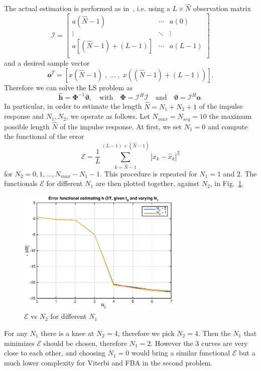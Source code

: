 \documentclass[10pt]{article}
\begin{document}
The actual estimation is performed as in~\cite[p.~246]{bc}, i.e. using a $L \times \hat{N}$ observation matrix
\begin{equation}
	\boldsymbol{\mathcal{I}} =
 \begin{bmatrix}
  a(\hat{N}-1) & \cdots & a(0) \\
  \vdots  & \ddots & \vdots  \\
a[(\hat{N}-1)+(L-1)] & \cdots & a(L-1) \\
 \end{bmatrix}
\end{equation}
and a desired sample vector
\begin{equation}
\mathbf{o}^T = \left[ x(\hat{N}-1)\;,\; \ldots\; , \;x((\hat{N}-1)+(L-1)) \right].
\end{equation}
Therefore we can solve the LS problem as
\begin{equation}
	\hat{\mathbf{h}}= \mathbf{\Phi}^{-1} \boldsymbol{\vartheta}, \quad\mathrm{ with } \quad \mathbf{\Phi}=\boldsymbol{\mathcal{I}}^H \boldsymbol{\mathcal{I}} \quad \mathrm{ and }\quad \boldsymbol{\vartheta} = \boldsymbol{\mathcal{I}}^H \mathbf{o}.
\end{equation}
In particular, in order to estimate the length $\hat{N} = N_1 + N_2 + 1$ of the impulse response and $N_1, N_2$, we operate as follows. Let $N_{max} = N_{seq} = 10$ the maximum possible length $\hat{N}$ of the impulse response. At first, we set $N_1 = 0$ and compute the functional of the error
\begin{equation} 
	\mathcal{E} = \frac{1}{L}\sum_{k = \hat{N} - 1}^{(L-1)+(\hat{N}-1)}|x_k-\hat{x}_k|^2
	\label{eq:functional}
\end{equation}
for $N_2 = 0, 1, \dots, N_{max} - N_1 - 1$. This procedure is repeated for $N_1 = 1$ and $2$. The functionals $\mathcal{E}$ for different $N_1$ are then plotted together, against $N_2$, in Fig.~\ref{fig:functional}.
\begin{figure}[h!]
	\centering
	\includegraphics[width = 0.7\textwidth]{error_func_p1}
	\caption{$\mathcal{E}$ vs $N_2$ for different $N_1$}
	\label{fig:functional}
\end{figure}
For any $N_1$ there is a knee at $N_2 = 4$, therefore we pick $N_2 = 4$. Then the $N_1$ that minimizes $\mathcal{E}$ should be chosen, therefore $N_1 = 2$. However the 3 curves are very close to each other, and choosing $N_1 = 0$ would bring a similar functional $\mathcal{E}$ but a much lower complexity for Viterbi and FBA in the second problem. 
\end{document}
